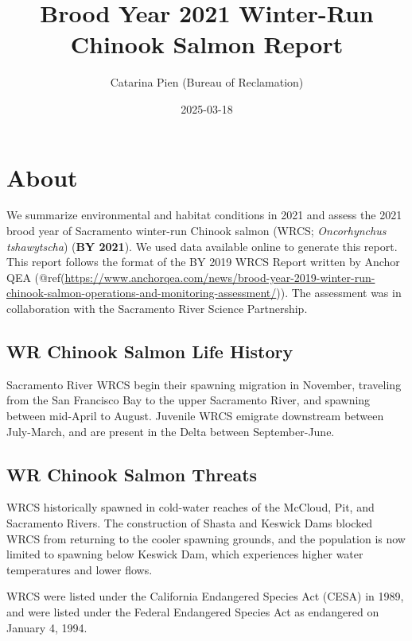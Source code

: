\documentclass[
]{book}
\title{Brood Year 2021 Winter-Run Chinook Salmon Report}
\author{Catarina Pien (Bureau of Reclamation)}
\date{2025-03-18}
\theoremstyle{definition}
\theoremstyle{definition}
\theoremstyle{definition}
\theoremstyle{definition}
\theoremstyle{remark}
\begin{document}
\maketitle

{
\setcounter{tocdepth}{1}
\tableofcontents
}
\hypertarget{about}{%
\chapter{About}\label{about}}

We summarize environmental and habitat conditions in 2021 and assess the 2021 brood year of Sacramento winter-run Chinook salmon (WRCS; \emph{Oncorhynchus tshawytscha}) (\textbf{BY 2021}). We used data available online to generate this report. This report follows the format of the BY 2019 WRCS Report written by Anchor QEA (@ref(\url{https://www.anchorqea.com/news/brood-year-2019-winter-run-chinook-salmon-operations-and-monitoring-assessment/})). The assessment was in collaboration with the Sacramento River Science Partnership.

\hypertarget{wr-chinook-salmon-life-history}{%
\section{WR Chinook Salmon Life History}\label{wr-chinook-salmon-life-history}}

Sacramento River WRCS begin their spawning migration in November, traveling from the San Francisco Bay to the upper Sacramento River, and spawning between mid-April to August. Juvenile WRCS emigrate downstream between July-March, and are present in the Delta between September-June.

\hypertarget{wr-chinook-salmon-threats}{%
\section{WR Chinook Salmon Threats}\label{wr-chinook-salmon-threats}}

WRCS historically spawned in cold-water reaches of the McCloud, Pit, and Sacramento Rivers. The construction of Shasta and Keswick Dams blocked WRCS from returning to the cooler spawning grounds, and the population is now limited to spawning below Keswick Dam, which experiences higher water temperatures and lower flows.

WRCS were listed under the California Endangered Species Act (CESA) in 1989, and were listed under the Federal Endangered Species Act as endangered on January 4, 1994.
\end{document}
